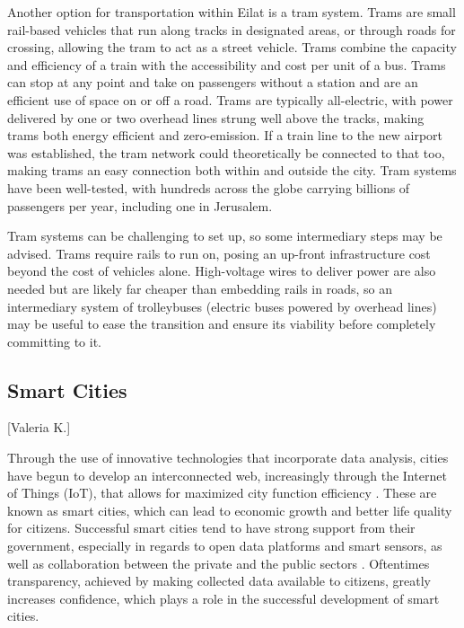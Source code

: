 \documentclass[12pt]{article}                         %
\begin{document}
Another option for transportation within Eilat is a tram system. Trams are small rail-based vehicles that run along tracks in designated areas, or through roads for crossing, allowing the tram to act as a street vehicle. Trams combine the capacity and efficiency of a train with the accessibility and cost per unit of a bus. Trams can stop at any point and take on passengers without a station and are an efficient use of space on or off a road. Trams are typically all-electric, with power delivered by one or two overhead lines strung well above the tracks, making trams both energy efficient and zero-emission. If a train line to the new airport was established, the tram network could theoretically be connected to that too, making trams an easy connection both within and outside the city. Tram systems have been well-tested, with hundreds across the globe carrying billions of passengers per year, including one in Jerusalem.

Tram systems can be challenging to set up, so some intermediary steps may be advised. Trams require rails to run on, posing an up-front infrastructure cost beyond the cost of vehicles alone. High-voltage wires to deliver power are also needed but are likely far cheaper than embedding rails in roads, so an intermediary system of trolleybuses (electric buses powered by overhead lines) may be useful to ease the transition and ensure its viability before completely committing to it. 

\subsection{Smart Cities}[Valeria K.]

Through the use of innovative technologies that incorporate data analysis, cities have begun to develop an interconnected web, increasingly through the Internet of Things (IoT), that allows for maximized city function efficiency \cite{MargaretRouseSmartCity}. These are known as smart cities, which can lead to economic growth and better life quality for citizens. Successful smart cities tend to have strong support from their government, especially in regards to open data platforms and smart sensors, as well as collaboration between the private and the public sectors \cite{BrianZanghi2017WhyExamples}. Oftentimes transparency, achieved by making collected data available to citizens, greatly increases confidence, which plays a role in the successful development of smart cities.
\end{document}
